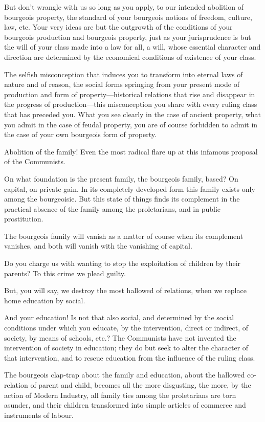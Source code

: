 But don’t wrangle with us so long as you apply, to our intended
abolition of bourgeois property, the standard of your bourgeois notions
of freedom, culture, law, etc. Your very ideas are but the outgrowth of
the conditions of your bourgeois production and bourgeois property,
just as your jurisprudence is but the will of your class made into a
law for all, a will, whose essential character and direction are
determined by the economical conditions of existence of your class.

The selfish misconception that induces you to transform into eternal
laws of nature and of reason, the social forms springing from your
present mode of production and form of property—historical relations
that rise and disappear in the progress of production—this
misconception you share with every ruling class that has preceded you.
What you see clearly in the case of ancient property, what you admit in
the case of feudal property, you are of course forbidden to admit in
the case of your own bourgeois form of property.

Abolition of the family! Even the most radical flare up at this
infamous proposal of the Communists.

On what foundation is the present family, the bourgeois family, based?
On capital, on private gain. In its completely developed form this
family exists only among the bourgeoisie. But this state of things
finds its complement in the practical absence of the family among the
proletarians, and in public prostitution.

The bourgeois family will vanish as a matter of course when its
complement vanishes, and both will vanish with the vanishing of
capital.

Do you charge us with wanting to stop the exploitation of children by
their parents? To this crime we plead guilty.

But, you will say, we destroy the most hallowed of relations, when we
replace home education by social.

And your education! Is not that also social, and determined by the
social conditions under which you educate, by the intervention, direct
or indirect, of society, by means of schools, etc.? The Communists have
not invented the intervention of society in education; they do but seek
to alter the character of that intervention, and to rescue education
from the influence of the ruling class.

The bourgeois clap-trap about the family and education, about the
hallowed co-relation of parent and child, becomes all the more
disgusting, the more, by the action of Modern Industry, all family ties
among the proletarians are torn asunder, and their children transformed
into simple articles of commerce and instruments of labour.

